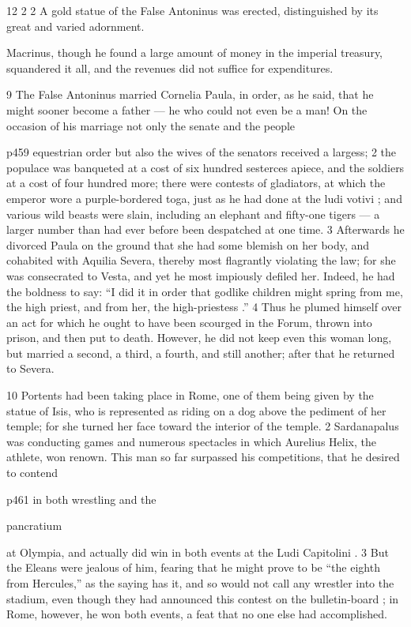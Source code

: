 12
2 2 A gold statue of the False Antoninus was erected, distinguished by its great and varied adornment.

Macrinus, though he found a large amount of money in the imperial treasury, squandered it all, and the revenues did not suffice for expenditures.

9
The False Antoninus married Cornelia Paula, in order, as he said, that he might sooner become a father \texthebrew{—} he who could not even be a man! On the occasion of his marriage not only the senate and the people

p459 equestrian order but also the wives of the senators received a largess; 2 the populace was banqueted at a cost of six hundred sesterces apiece, and the soldiers at a cost of four hundred more; there were contests of gladiators, at which the emperor wore a purple-bordered toga, just as he had done at the ludi votivi ; and various wild beasts were slain, including an elephant and fifty-one tigers \texthebrew{—} a larger number than had ever before been despatched at one time. 3 Afterwards he divorced Paula on the ground that she had some blemish on her body, and cohabited with Aquilia Severa, thereby most flagrantly violating the law; for she was consecrated to Vesta, and yet he most impiously defiled her. Indeed, he had the boldness to say: ``I did it in order that godlike children might spring from me, the high priest, and from her, the high-priestess .'' 4 Thus he plumed himself over an act for which he ought to have been scourged in the Forum, thrown into prison, and then put to death. However, he did not keep even this woman long, but married a second, a third, a fourth, and still another; after that he returned to Severa.

10
Portents had been taking place in Rome, one of them being given by the statue of Isis, who is represented as riding on a dog above the pediment of her temple; for she turned her face toward the interior of the temple. 2 Sardanapalus was conducting games and numerous spectacles in which Aurelius Helix, the athlete, won renown. This man so far surpassed his competitions, that he desired to contend

p461 in both wrestling and the

pancratium

at Olympia, and actually did win in both events at the Ludi Capitolini . 3 But the Eleans were jealous of him, fearing that he might prove to be ``the eighth from Hercules,'' as the saying has it, and so would not call any wrestler into the stadium, even though they had announced this contest on the bulletin-board ; in Rome, however, he won both events, a feat that no one else had accomplished.

